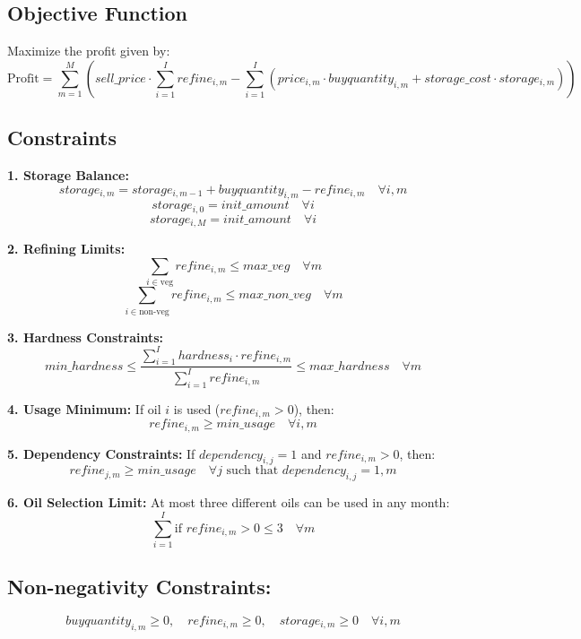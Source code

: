 \documentclass{article}
\begin{document}
\subsection*{Objective Function}
Maximize the profit given by:
\[
\text{Profit} = \sum_{m=1}^{M} \left( sell\_price \cdot \sum_{i=1}^{I} refine_{i,m} - \sum_{i=1}^{I} (price_{i,m} \cdot buyquantity_{i,m} + storage\_cost \cdot storage_{i,m}) \right)
\]

\subsection*{Constraints}

\textbf{1. Storage Balance:}
\[
storage_{i,m} = storage_{i,m-1} + buyquantity_{i,m} - refine_{i,m} \quad \forall i, m
\]
\[
storage_{i,0} = init\_amount \quad \forall i
\]
\[
storage_{i,M} = init\_amount \quad \forall i
\]

\textbf{2. Refining Limits:}
\[
\sum_{i \in \text{veg}} refine_{i,m} \leq max\_veg \quad \forall m
\]
\[
\sum_{i \in \text{non-veg}} refine_{i,m} \leq max\_non\_veg \quad \forall m
\]

\textbf{3. Hardness Constraints:}
\[
min\_hardness \leq \frac{\sum_{i=1}^{I} hardness_{i} \cdot refine_{i,m}}{\sum_{i=1}^{I} refine_{i,m}} \leq max\_hardness \quad \forall m
\]

\textbf{4. Usage Minimum:}
If oil \( i \) is used (\( refine_{i,m} > 0 \)), then:
\[
refine_{i,m} \geq min\_usage \quad \forall i, m
\]

\textbf{5. Dependency Constraints:}
If \( dependency_{i,j} = 1 \) and \( refine_{i,m} > 0 \), then:
\[
refine_{j,m} \geq min\_usage \quad \forall j \text{ such that } dependency_{i,j} = 1, m
\]

\textbf{6. Oil Selection Limit:}
At most three different oils can be used in any month:
\[
\sum_{i=1}^{I} \text{if } refine_{i,m} > 0 \leq 3 \quad \forall m
\]

\subsection*{Non-negativity Constraints:}
\[
buyquantity_{i,m} \geq 0, \quad refine_{i,m} \geq 0, \quad storage_{i,m} \geq 0 \quad \forall i, m
\]
\end{document}

